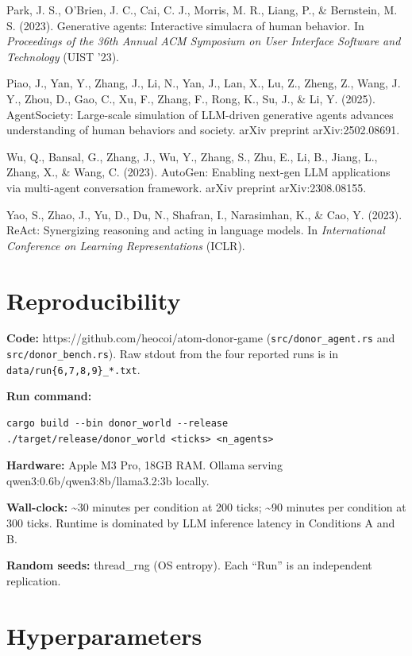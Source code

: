 \documentclass[
  11pt,
  letterpaper,
]{article}
\begin{document}
Park, J. S., O'Brien, J. C., Cai, C. J., Morris, M. R., Liang, P., \&
Bernstein, M. S. (2023). Generative agents: Interactive simulacra of
human behavior. In \emph{Proceedings of the 36th Annual ACM Symposium on
User Interface Software and Technology} (UIST '23).

Piao, J., Yan, Y., Zhang, J., Li, N., Yan, J., Lan, X., Lu, Z., Zheng,
Z., Wang, J. Y., Zhou, D., Gao, C., Xu, F., Zhang, F., Rong, K., Su, J.,
\& Li, Y. (2025). AgentSociety: Large-scale simulation of LLM-driven
generative agents advances understanding of human behaviors and society.
arXiv preprint arXiv:2502.08691.

Wu, Q., Bansal, G., Zhang, J., Wu, Y., Zhang, S., Zhu, E., Li, B.,
Jiang, L., Zhang, X., \& Wang, C. (2023). AutoGen: Enabling next-gen LLM
applications via multi-agent conversation framework. arXiv preprint
arXiv:2308.08155.

Yao, S., Zhao, J., Yu, D., Du, N., Shafran, I., Narasimhan, K., \& Cao,
Y. (2023). ReAct: Synergizing reasoning and acting in language models.
In \emph{International Conference on Learning Representations} (ICLR).

\appendix
\section{Reproducibility}\label{reproducibility}

\textbf{Code:} https://github.com/heocoi/atom-donor-game
(\texttt{src/donor\_agent.rs} and \texttt{src/donor\_bench.rs}). Raw
stdout from the four reported runs is in
\texttt{data/run\{6,7,8,9\}\_*.txt}.

\textbf{Run command:}

\begin{verbatim}
cargo build --bin donor_world --release
./target/release/donor_world <ticks> <n_agents>
\end{verbatim}

\textbf{Hardware:} Apple M3 Pro, 18GB RAM. Ollama serving
qwen3:0.6b/qwen3:8b/llama3.2:3b locally.

\textbf{Wall-clock:} \textasciitilde30 minutes per condition at 200
ticks; \textasciitilde90 minutes per condition at 300 ticks. Runtime is
dominated by LLM inference latency in Conditions A and B.

\textbf{Random seeds:} thread\_rng (OS entropy). Each ``Run'' is an
independent replication.

\section{Hyperparameters}\label{hyperparameters}
\end{document}
